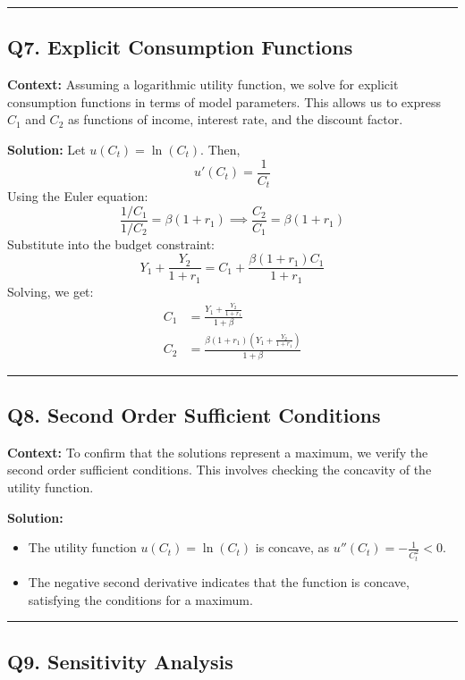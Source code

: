 \documentclass{article}
\begin{document}
\noindent\rule{\linewidth}{0.5pt}

\subsection*{Q7. Explicit Consumption Functions}

\textbf{Context:} Assuming a logarithmic utility function, we solve for explicit consumption functions in terms of model parameters. This allows us to express \( C_1 \) and \( C_2 \) as functions of income, interest rate, and the discount factor.

\textbf{Solution:} Let \( u(C_t) = \ln(C_t) \). Then,
\[
u'(C_t) = \frac{1}{C_t}
\]
Using the Euler equation:
\[
\frac{1/C_1}{1/C_2} = \beta (1 + r_1) \implies \frac{C_2}{C_1} = \beta (1 + r_1)
\]
Substitute into the budget constraint:
\[
Y_1 + \frac{Y_2}{1 + r_1} = C_1 + \frac{\beta (1 + r_1) C_1}{1 + r_1}
\]
Solving, we get:
\begin{align*}
    C_1 &= \frac{Y_1 + \frac{Y_2}{1 + r_1}}{1 + \beta} \\
    C_2 &= \frac{\beta (1 + r_1) (Y_1 + \frac{Y_2}{1 + r_1})}{1 + \beta}
\end{align*}

\noindent\rule{\linewidth}{0.5pt}

\subsection*{Q8. Second Order Sufficient Conditions}

\textbf{Context:} To confirm that the solutions represent a maximum, we verify the second order sufficient conditions. This involves checking the concavity of the utility function.

\textbf{Solution:}
\begin{itemize}
    \item The utility function \( u(C_t) = \ln(C_t) \) is concave, as \( u''(C_t) = -\frac{1}{C_t^2} < 0 \).
    \item The negative second derivative indicates that the function is concave, satisfying the conditions for a maximum.
\end{itemize}

\noindent\rule{\linewidth}{0.5pt}


\subsection*{Q9. Sensitivity Analysis}
\end{document}
